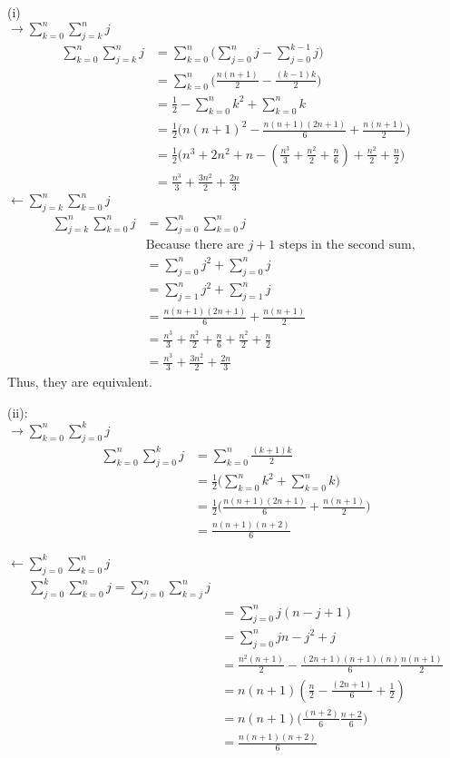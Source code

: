 \documentclass[letterpaper,12pt]{article}
\theoremstyle{definition}
\begin{document}
(i)\\
$\rightarrow \sum^n_{k=0}\sum^n_{j=k}j$
\begin{align*}
    \sum^n_{k=0}\sum^n_{j=k}j& = \sum^n_{k=0}\Big(\sum^{n}_{j=0}j-\sum^{k-1}_{j=0}j\Big) \\
    & = \sum^n_{k=0}\Big(\frac{n(n+1)}{2}-\frac{(k-1)k}{2}\Big) \\
    & = \frac{1}{2} - \sum^n_{k=0}k^2 + \sum^n_{k=0}k \\
    & = \frac{1}{2} \Big( n(n+1)^2 - \frac{n (n+1)(2n+1)}{6} + \frac{n(n+1)}{2} \Big) \\
    & = \frac{1}{2} \Big( n^3 + 2n^2 +n -(\frac{n^3}{3} + \frac{n^2}{2} + \frac{n}{6}) + 
        \frac{n^2}{2} + \frac{n}{2} \Big) \\
    & = \frac{n^3}{3} + \frac{3n^2}{2} + \frac{2n}{3}
\end{align*}
$\leftarrow \sum^n_{j=k}\sum^n_{k=0}j$
\begin{align*}
    \sum^n_{j=k}\sum^n_{k=0}j & = \sum^n_{j=0}\sum^n_{k=0}j \\
    & \text{Because there are $j+1$ steps in the second sum, }\\
    & = \sum^n_{j=0} j^2 + \sum^n_{j=0}j \\
    & = \sum^n_{j=1} j^2 + \sum^n_{j=1}j \\
    & = \frac{n(n+1)(2n+1)}{6} + \frac{n(n+1)}{2} \\
    & = \frac{n^3}{3} + \frac{n^2}{2} + \frac{n}{6} + \frac{n^2}{2} + \frac{n}{2} \\
    & = \frac{n^3}{3} + \frac{3n^2}{2} + \frac{2n}{3}
\end{align*}
Thus, they are equivalent.

(ii): \\
$\rightarrow \sum_{k=0}^n \sum_{j=0}^k j$
\begin{align*}
    \sum_{k=0}^n \sum_{j=0}^k j & = \sum_{k=0}^n \frac{(k+1)k}{2} \\
    & = \frac{1}{2} \big( \sum_{k=0}^n k^2 + \sum_{k=0}^n k \big) \\
    & = \frac{1}{2} \big( \frac{n(n+1)(2n+1)}{6} + \frac{n(n+1)}{2} \big)\\
    & = \frac{n(n+1)(n+2)}{6}
\end{align*}

$\leftarrow \sum_{j=0}^k\sum_{k=0}^n j$
\begin{align*}
    \sum_{j=0}^k\sum_{k=0}^n j = \sum_{j=0}^n\sum_{k=j}^n j \\
    & = \sum_{j=0}^n j(n-j+1) \\
    & = \sum_{j=0}^n jn-j^2 + j \\
    & = \frac{n^2(n+1)}{2} - \frac{(2n+1)(n+1)(n)}{6} \frac{n(n+1)}{2} \\
    & = n(n+1)(\frac{n}{2} - \frac{(2n+1)}{6} + \frac{1}{2}) \\
    & = n(n+1) \Big(\frac{(n+2)}{6} \frac{n+2}{6}\Big)\\
    & = \frac{n(n+1)(n+2)}{6}
\end{align*}
\end{document}
